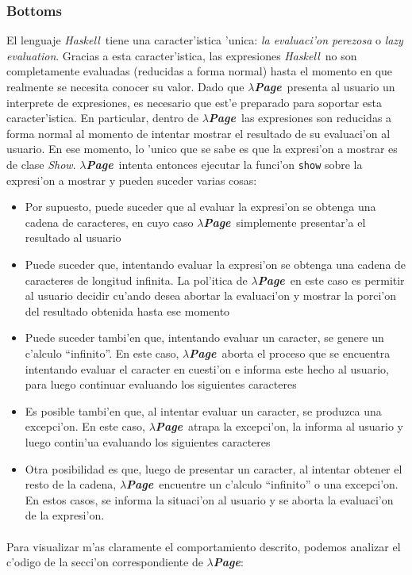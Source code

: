 \documentclass[a4paper]{article}
\newcommand{\haskell}{\textsl{Haskell}}
\newcommand{\hpage}{\textbf{\textsl{$\lambda$Page}}}
\begin{document}
\subsubsection{Bottoms}El lenguaje \haskell\ tiene una caracter'istica 'unica: \textsl{la evaluaci'on perezosa} o \textsl{lazy evaluation}.  Gracias a esta caracter'istica, las expresiones \haskell\ no son completamente evaluadas (reducidas a forma normal) hasta el momento en que realmente se necesita conocer su valor.  Dado que \hpage\ presenta al usuario un interprete de expresiones, es necesario que est'e preparado para soportar esta caracter'istica.  En particular, dentro de \hpage\ las expresiones son reducidas a forma normal al momento de intentar mostrar el resultado de su evaluaci'on al usuario.  En ese momento, lo 'unico que se sabe es que la expresi'on a mostrar es de clase \textsl{Show}.  \hpage\ intenta entonces ejecutar la funci'on \texttt{show} sobre la expresi'on a mostrar y pueden suceder varias cosas:
\begin{itemize}
	\item Por supuesto, puede suceder que al evaluar la expresi'on se obtenga una cadena de caracteres, en cuyo caso \hpage\ simplemente presentar'a el resultado al usuario
	\item Puede suceder que, intentando evaluar la expresi'on se obtenga una cadena de caracteres de longitud infinita.  La pol'itica de \hpage\ en este caso es permitir al usuario decidir cu'ando desea abortar la evaluaci'on y mostrar la porci'on del resultado obtenida hasta ese momento
	\item Puede suceder tambi'en que, intentando evaluar un caracter, se genere un c'alculo ``infinito''.  En este caso, \hpage\ aborta el proceso que se encuentra intentando evaluar el caracter en cuesti'on e informa este hecho al usuario, para luego continuar evaluando los siguientes caracteres
	\item Es posible tambi'en que, al intentar evaluar un caracter, se produzca una excepci'on.  En este caso, \hpage\ atrapa la excepci'on, la informa al usuario y luego contin'ua evaluando los siguientes caracteres
	\item Otra posibilidad es que, luego de presentar un caracter, al intentar obtener el resto de la cadena, \hpage\ encuentre un c'alculo ``infinito'' o una excepci'on.  En estos casos, se informa la situaci'on al usuario y se aborta la evaluaci'on de la expresi'on.
\end{itemize}
\paragraph{}Para visualizar m'as claramente el comportamiento descrito, podemos analizar el c'odigo de la secci'on correspondiente de \hpage:
\end{document}
